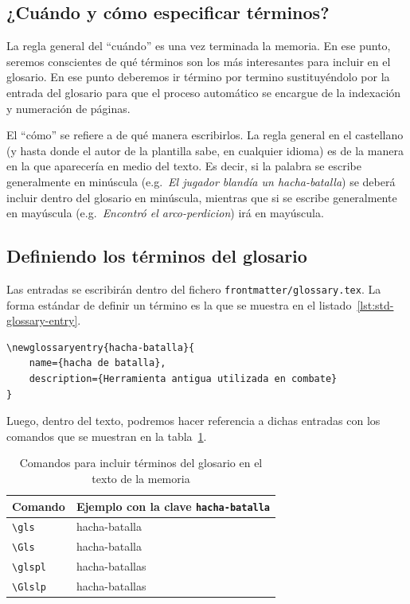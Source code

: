 \documentclass[%
    school=etsisi,%
    type=pfg,%
    degree=61CI,%
]{upm-report}
\begin{document}
\subsection{¿Cuándo y cómo especificar términos?}

La regla general del \enquote{cuándo} es una vez terminada la memoria. En ese punto, seremos conscientes de qué términos son los más interesantes para incluir en el glosario. En ese punto deberemos ir término por termino sustituyéndolo por la entrada del glosario para que el proceso automático se encargue de la indexación y numeración de páginas.

El \enquote{cómo} se refiere a de qué manera escribirlos. La regla general en el castellano (y hasta donde el autor de la plantilla sabe, en cualquier idioma) es de la manera en la que aparecería en medio del texto. Es decir, si la palabra se escribe generalmente en minúscula (e.g.~\textit{El jugador blandía un \gls{hacha-batalla}}) se deberá incluir dentro del glosario en minúscula, mientras que si se escribe generalmente en mayúscula (e.g.~\textit{Encontró el \gls{arco-perdicion}}) irá en mayúscula.

\subsection{Definiendo los términos del glosario}

Las entradas se escribirán dentro del fichero \texttt{frontmatter/glossary.tex}. La forma estándar de definir un término es la que se muestra en el listado~\ref{lst:std-glossary-entry}.

\begin{lstlisting}[language={[latex]TeX},caption=Código para crear una entrada en el glosario,label=lst:std-glossary-entry]
\newglossaryentry{hacha-batalla}{
    name={hacha de batalla},
    description={Herramienta antigua utilizada en combate}
}
\end{lstlisting}

Luego, dentro del texto, podremos hacer referencia a dichas entradas con los comandos que se muestran en la tabla~\ref{tab:glossary-commands}.

\begin{table}
    \caption{\label{tab:glossary-commands}Comandos para incluir términos del glosario en el texto de la memoria}
    \begin{tabularx}{\textwidth}{@{}lX@{}}
        \toprule
        \textbf{Comando} & \textbf{Ejemplo con la clave \texttt{hacha-batalla}} \\
        \midrule
        \texttt{\textbackslash gls} & \gls{hacha-batalla} \\
        \texttt{\textbackslash Gls} & \Gls{hacha-batalla} \\
        \texttt{\textbackslash glspl} & \glspl{hacha-batalla} \\
        \texttt{\textbackslash Glslp} & \Glspl{hacha-batalla} \\
        \bottomrule
    \end{tabularx}
\end{table}
\end{document}

